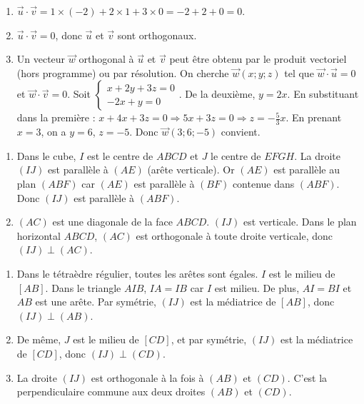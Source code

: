 \begin{enumerate}[label=\alph*)]
\item $\vec{u}\cdot\vec{v}=1\times(-2)+2\times1+3\times0=-2+2+0=0$.
\item $\vec{u}\cdot\vec{v}=0$, donc $\vec{u}$ et $\vec{v}$ sont orthogonaux.
\item Un vecteur $\vec{w}$ orthogonal à $\vec{u}$ et $\vec{v}$ peut être obtenu par le produit vectoriel (hors programme) ou par résolution. On cherche $\vec{w}(x;y;z)$ tel que $\vec{w}\cdot\vec{u}=0$ et $\vec{w}\cdot\vec{v}=0$. Soit $\begin{cases} x+2y+3z=0 \\ -2x+y=0 \end{cases}$. De la deuxième, $y=2x$. En substituant dans la première : $x+4x+3z=0 \Rightarrow 5x+3z=0 \Rightarrow z=-\frac{5}{3}x$. En prenant $x=3$, on a $y=6$, $z=-5$. Donc $\vec{w}(3;6;-5)$ convient.
\end{enumerate}

\begin{enumerate}[label=\alph*)]
\item Dans le cube, $I$ est le centre de $ABCD$ et $J$ le centre de $EFGH$. La droite $(IJ)$ est parallèle à $(AE)$ (arête verticale). Or $(AE)$ est parallèle au plan $(ABF)$ car $(AE)$ est parallèle à $(BF)$ contenue dans $(ABF)$. Donc $(IJ)$ est parallèle à $(ABF)$.
\item $(AC)$ est une diagonale de la face $ABCD$. $(IJ)$ est verticale. Dans le plan horizontal $ABCD$, $(AC)$ est orthogonale à toute droite verticale, donc $(IJ)\perp(AC)$.
\end{enumerate}

\begin{enumerate}[label=\alph*)]
\item Dans le tétraèdre régulier, toutes les arêtes sont égales. $I$ est le milieu de $[AB]$. Dans le triangle $AIB$, $IA=IB$ car $I$ est milieu. De plus, $AI=BI$ et $AB$ est une arête. Par symétrie, $(IJ)$ est la médiatrice de $[AB]$, donc $(IJ)\perp(AB)$.
\item De même, $J$ est le milieu de $[CD]$, et par symétrie, $(IJ)$ est la médiatrice de $[CD]$, donc $(IJ)\perp(CD)$.
\item La droite $(IJ)$ est orthogonale à la fois à $(AB)$ et $(CD)$. C'est la perpendiculaire commune aux deux droites $(AB)$ et $(CD)$.
\end{enumerate}

